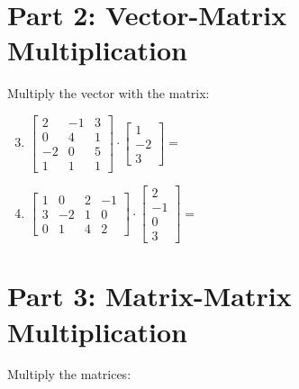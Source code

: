 \documentclass{article}
\begin{document}
\section*{Part 2: Vector-Matrix Multiplication}
Multiply the vector with the matrix:

\begin{enumerate}
	\setcounter{enumi}{2}
	\item $\begin{bmatrix} 2 & -1 & 3 \\ 0 & 4 & 1 \\ -2 & 0 & 5 \\ 1 & 1 & 1 \end{bmatrix} \cdot \begin{bmatrix} 1 \\ -2 \\ 3 \end{bmatrix} = $ \underline{\hspace{3cm}}
	
	\item $\begin{bmatrix} 1 & 0 & 2 & -1 \\ 3 & -2 & 1 & 0 \\ 0 & 1 & 4 & 2 \end{bmatrix} \cdot \begin{bmatrix} 2 \\ -1 \\ 0 \\ 3 \end{bmatrix} = $ \underline{\hspace{3cm}}
\end{enumerate}

\section*{Part 3: Matrix-Matrix Multiplication}
Multiply the matrices:
\end{document}

